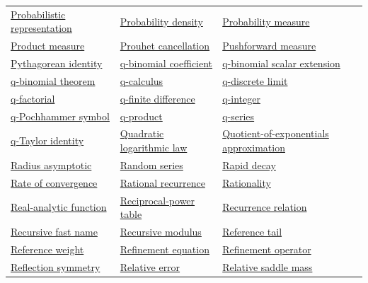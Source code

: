 \documentclass[11pt,oneside]{article}
\begin{document}
\begin{longtable}{p{}p{}p{}}
\hyperlink{gls:probabilistic-representation}{Probabilistic representation} & \hyperlink{gls:probability-density}{Probability density} & \hyperlink{gls:probability-measure}{Probability measure} \\
\hyperlink{gls:product-measure}{Product measure} & \hyperlink{gls:prouhet-cancellation}{Prouhet cancellation} & \hyperlink{gls:pushforward-measure}{Pushforward measure} \\
\hyperlink{gls:pythagorean-identity}{Pythagorean identity} & \hyperlink{gls:q-binomial-coefficient}{q-binomial coefficient} & \hyperlink{gls:q-binomial-scalar-extension}{q-binomial scalar extension} \\
\hyperlink{gls:q-binomial-theorem}{q-binomial theorem} & \hyperlink{gls:q-calculus}{q-calculus} & \hyperlink{gls:q-discrete-limit}{q-discrete limit} \\
\hyperlink{gls:q-factorial}{q-factorial} & \hyperlink{gls:q-finite-difference}{q-finite difference} & \hyperlink{gls:q-integer}{q-integer} \\
\hyperlink{gls:q-pochhammer-symbol}{q-Pochhammer symbol} & \hyperlink{gls:q-product}{q-product} & \hyperlink{gls:q-series}{q-series} \\
\hyperlink{gls:q-taylor-identity}{q-Taylor identity} & \hyperlink{gls:quadratic-logarithmic-law}{Quadratic logarithmic law} & \hyperlink{gls:quotient-of-exponentials-approximation}{Quotient-of-exponentials approximation} \\
\hyperlink{gls:radius-asymptotic}{Radius asymptotic} & \hyperlink{gls:random-series}{Random series} & \hyperlink{gls:rapid-decay}{Rapid decay} \\
\hyperlink{gls:rate-of-convergence}{Rate of convergence} & \hyperlink{gls:rational-recurrence}{Rational recurrence} & \hyperlink{gls:rationality}{Rationality} \\
\hyperlink{gls:real-analytic-function}{Real-analytic function} & \hyperlink{gls:reciprocal-power-table}{Reciprocal-power table} & \hyperlink{gls:recurrence-relation}{Recurrence relation} \\
\hyperlink{gls:recursive-fast-name}{Recursive fast name} & \hyperlink{gls:recursive-modulus}{Recursive modulus} & \hyperlink{gls:reference-tail}{Reference tail} \\
\hyperlink{gls:reference-weight}{Reference weight} & \hyperlink{gls:refinement-equation}{Refinement equation} & \hyperlink{gls:refinement-operator}{Refinement operator} \\
\hyperlink{gls:reflection-symmetry}{Reflection symmetry} & \hyperlink{gls:relative-error}{Relative error} & \hyperlink{gls:relative-saddle-mass}{Relative saddle mass} \\

\end{longtable}
\end{document}
